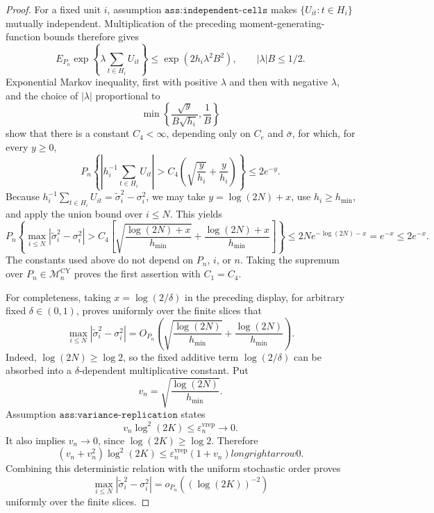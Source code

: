 \documentclass{article}
\begin{document}
\begin{proof}
For a fixed unit \(i\), assumption \(\texttt{ass:independent-cells}\)
makes \(\{U_{it}:t\in H_i\}\) mutually independent.  Multiplication of
the preceding moment-generating-function bounds therefore gives
\[
 E_{P_n}\exp\!\left\{\lambda\sum_{t\in H_i}U_{it}\right\}
 \le \exp(2h_i\lambda^2B^2),
 \qquad |\lambda|B\le1/2.
\]
Exponential Markov inequality, first with positive \(\lambda\) and then
with negative \(\lambda\), and the choice of \(|\lambda|\) proportional
to
\[
 \min\!\left\{\frac{\sqrt y}{B\sqrt{h_i}},\frac1B\right\}
\]
show that there is a constant \(C_4<\infty\), depending only on
\(C_e\) and \(\bar\sigma\), for which, for every \(y\ge0\),
\[
 P_n\!\left\{
 \left|h_i^{-1}\sum_{t\in H_i}U_{it}\right|
 >C_4\left(\sqrt{\frac y{h_i}}+\frac y{h_i}\right)
 \right\}\le2e^{-y}.
\]
Because
\(h_i^{-1}\sum_{t\in H_i}U_{it}=\widetilde\sigma_i^2-\sigma_i^2\),
we may take \(y=\log(2N)+x\), use \(h_i\ge h_{\min}\), and apply the
union bound over \(i\le N\).  This yields
\[
 P_n\!\left\{
 \max_{i\le N}|\widetilde\sigma_i^2-\sigma_i^2|
 >C_4\left[
 \sqrt{\frac{\log(2N)+x}{h_{\min}}}
 +\frac{\log(2N)+x}{h_{\min}}
 \right]\right\}
 \le 2N e^{-\log(2N)-x}=e^{-x}\le2e^{-x}.
\]
The constants used above do not depend on \(P_n\), \(i\), or \(n\).
Taking the supremum over \(P_n\in\mathcal M_n^{\mathrm{CY}}\) proves the
first assertion with \(C_1=C_4\).

For completeness, taking \(x=\log(2/\delta)\) in the preceding display,
for arbitrary fixed \(\delta\in(0,1)\), proves uniformly over the finite
slices that
\[
 \max_{i\le N}|\widetilde\sigma_i^2-\sigma_i^2|
 =O_{P_n}\!\left(
 \sqrt{\frac{\log(2N)}{h_{\min}}}
 +\frac{\log(2N)}{h_{\min}}
 \right).
\]
Indeed, \(\log(2N)\ge\log2\), so the fixed additive term
\(\log(2/\delta)\) can be absorbed into a \(\delta\)-dependent
multiplicative constant.  Put
\[
 v_n=\sqrt{\frac{\log(2N)}{h_{\min}}}.
\]
Assumption \(\texttt{ass:variance-replication}\) states
\[
 v_n\log^2(2K)\le\varepsilon_n^{\mathrm{vrep}}\longrightarrow0.
\]
It also implies \(v_n\to0\), since \(\log(2K)\ge\log2\).  Therefore
\[
 (v_n+v_n^2)\log^2(2K)
 \le \varepsilon_n^{\mathrm{vrep}}(1+v_n)longrightarrow0.
\]
Combining this deterministic relation with the uniform stochastic order
proves
\[
 \max_{i\le N}|\widetilde\sigma_i^2-\sigma_i^2|
 =o_{P_n}((\log(2K))^{-2})
\]
uniformly over the finite slices.


\end{proof}
\end{document}
